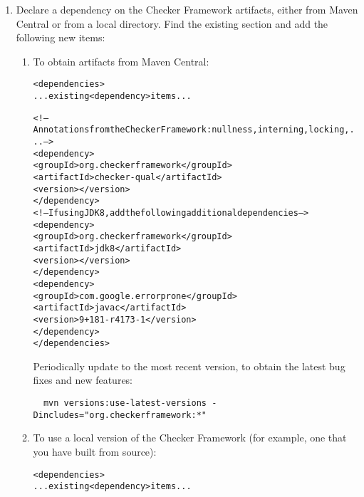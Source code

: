 \begin{enumerate}

\item Declare a dependency on the Checker Framework artifacts, either from
  Maven Central or from a local directory.  Find the
  existing  section and add the following new
   items:

\begin{enumerate}
\item
  To obtain artifacts from Maven Central:

\begin{alltt}
  <dependencies>
    ... existing <dependency> items ...

    <!-- Annotations from the Checker Framework: nullness, interning, locking, ... -->
    <dependency>
      <groupId>org.checkerframework</groupId>
      <artifactId>checker-qual</artifactId>
      <version>\ReleaseVersion{}</version>
    </dependency>
    <!-- If using JDK 8, add the following additional dependencies -->
    <dependency>
      <groupId>org.checkerframework</groupId>
      <artifactId>jdk8</artifactId>
      <version>\ReleaseVersion{}</version>
    </dependency>
    <dependency>
      <groupId>com.google.errorprone</groupId>
      <artifactId>javac</artifactId>
      <version>9+181-r4173-1</version>
    </dependency>
  </dependencies>
\end{alltt}

Periodically update to the most recent version, to obtain the
latest bug fixes and new features:
\begin{Verbatim}
  mvn versions:use-latest-versions -Dincludes="org.checkerframework:*"
\end{Verbatim}

\item
  To use a local version of the Checker Framework (for example,
  one that you have built from source):

\begin{alltt}
  <dependencies>
    ... existing <dependency> items ...


\end{alltt}
\end{enumerate}
\end{enumerate}
